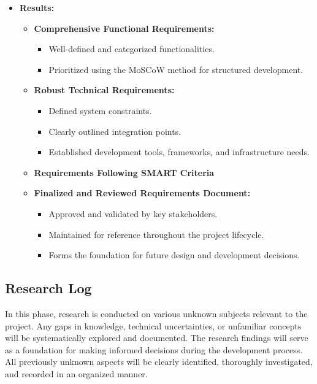 \documentclass{article}
\begin{document}
\begin{itemize}[leftmargin=*, label={}]
    \item \textbf{Results:}
        \begin{itemize}
            \item \textbf{Comprehensive Functional Requirements:}
                \begin{itemize}
                    \item Well-defined and categorized functionalities.
                    \item Prioritized using the MoSCoW method for structured development.
                \end{itemize}
            \item \textbf{Robust Technical Requirements:}
                \begin{itemize}
                    \item Defined system constraints.
                    \item Clearly outlined integration points.
                    \item Established development tools, frameworks, and infrastructure needs.
                \end{itemize}
            \item \textbf{Requirements Following SMART Criteria}
            \item \textbf{Finalized and Reviewed Requirements Document:}
                \begin{itemize}
                    \item Approved and validated by key stakeholders.
                    \item Maintained for reference throughout the project lifecycle.
                    \item Forms the foundation for future design and development decisions.
                \end{itemize}
        \end{itemize}
\end{itemize}

\subsection{Research Log}
In this phase, research is conducted on various unknown subjects relevant to the project. Any gaps in knowledge, technical uncertainties, or unfamiliar concepts will be systematically explored and documented. The research findings will serve as a foundation for making informed decisions during the development process. All previously unknown aspects will be clearly identified, thoroughly investigated, and recorded in an organized manner.
\end{document}
